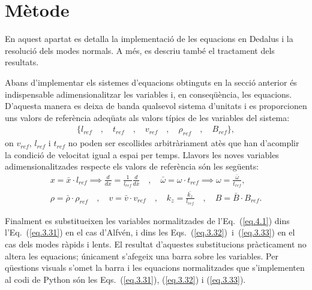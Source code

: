 
\chapter{Mètode} \label{sec:mètode}
En aquest apartat es detalla la implementació de les equacions en Dedalus i la resolució dels modes normals.
A més, es descriu també el tractament dels resultats.

Abans d'implementar els sistemes d'equacions obtinguts en la secció anterior %
és indispensable adimensionalitzar les variables i, en conseqüència, les equacions.
D'aquesta manera es deixa de banda qualsevol sistema d'unitats i es proporcionen uns valors de referència adeqüats als valors típics de les variables del sistema:
\begin{align*}
	\bigl\{  l_{ref} \quad , \quad t_{ref} \quad , \quad v_{ref} \quad , \quad \rho_{ref} \quad , \quad B_{ref} \bigr\},
\end{align*}
on $v_{ref}$, $l_{ref}$ i $t_{ref}$ no poden ser escollides arbitràriament atès que han d'acomplir la condició de velocitat igual a espai per temps.
Llavors les noves variables adimensionalitzades respecte els valors de referència són les següents:
\begin{equation}
	\begin{gathered}
		x = \bar{x} \cdot l_{ref}  \implies \frac{d}{dx} = \frac{1}{l_{ref}} \frac{d}{d \bar{x}} \quad , \quad \bar{\omega} = \omega \cdot t_{ref} \implies \omega = \frac{\bar{\omega}}{t_{ref}}, \\
		\rho = \bar{\rho} \cdot \rho_{ref} \quad , \quad v = \bar{v} \cdot v_{ref} \quad , \quad k_z = \frac{\bar{k_z}}{l_{ref}} \quad , \quad B = \bar{B} \cdot B_{ref}.
	\end{gathered}
	\tag{4.1} \label{eq.4.1}
\end{equation}

Finalment es substitueixen les variables normalitzades de l'Eq.~(\ref{eq.4.1}) dins l'Eq.~(\ref{eq.3.31}) en el cas d'Alfvén,
i dins les Eqs.~(\ref{eq.3.32})~i~(\ref{eq.3.33}) en el cas dels modes ràpids i lents.
El resultat d'aquestes substitucions pràcticament no altera les equacions; únicament s'afegeix una barra sobre les variables.
Per qüestions visuals s'omet la barra i les equacions normalitzades que s'implementen al codi de Python són les Eqs.~(\ref{eq.3.31}), (\ref{eq.3.32}) i (\ref{eq.3.33}).


